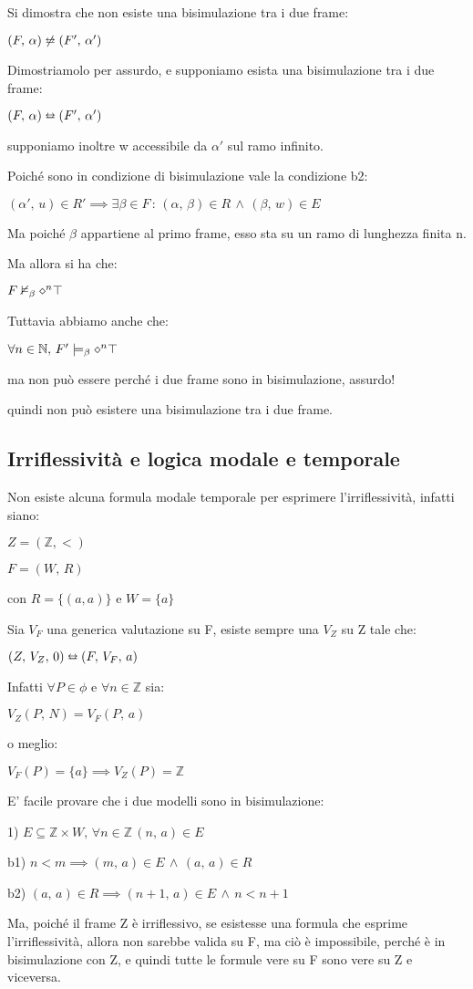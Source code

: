 Si dimostra che non esiste una bisimulazione tra i due frame:

$(F,\,\alpha)\not\leftrightarroweq(F',\,\alpha')$

Dimostriamolo per assurdo, e supponiamo esista una bisimulazione tra
i due frame: 

$(F,\,\alpha)\leftrightarroweq(F',\,\alpha')$

supponiamo inoltre w accessibile da $\alpha'$ sul ramo infinito.

Poiché sono in condizione di bisimulazione vale la condizione b2:

$(\alpha',\, u)\in R'\implies\exists\beta\in F\,:\,(\alpha,\,\beta)\in R\,\wedge\,(\beta,\, w)\in E$

Ma poiché $\beta$ appartiene al primo frame, esso sta su un ramo
di lunghezza finita n.

Ma allora si ha che:

$F\nvDash_{\beta}\diamond^{n}\top$

Tuttavia abbiamo anche che:

$\forall n\in\mathbb{N},\, F'\models_{\beta}\diamond^{n}\top$

ma non può essere perché i due frame sono in bisimulazione, assurdo!

quindi non può esistere una bisimulazione tra i due frame.


\subsection{Irriflessività e logica modale e temporale}

Non esiste alcuna formula modale temporale per esprimere l'irriflessività,
infatti siano:

$Z=(\mathbb{Z},<)$

$F=(W,\, R)$

con $R=\{(a,a)\}$ e $W=\{a\}$

Sia $V_{F}$ una generica valutazione su F, esiste sempre una $V_{Z}$
su Z tale che:

$(Z,\, V_{Z},\,0)\leftrightarroweq(F,\, V_{F},\, a)$

Infatti $\forall P\in\phi$ e $\forall n\in\mathbb{Z}$ sia:

$V_{Z}(P,\, N)=V_{F}(P,\, a)$ 

o meglio:

$V_{F}(P)=\{a\}\implies V_{Z}(P)=\mathbb{Z}$

E' facile provare che i due modelli sono in bisimulazione:

1) $E\subseteq\mathbb{Z}\times W,\,\forall n\in\mathbb{Z}\,(n,\, a)\in E$

b1) $n<m\implies(m,\, a)\in E\,\wedge\,(a,\, a)\in R$

b2) $(a,\, a)\in R\implies(n+1,\, a)\in E\,\wedge\, n<n+1$

Ma, poiché il frame Z è irriflessivo, se esistesse una formula che
esprime l'irriflessività, allora non sarebbe valida su F, ma ciò è
impossibile, perché è in bisimulazione con Z, e quindi tutte le formule
vere su F sono vere su Z e viceversa.
